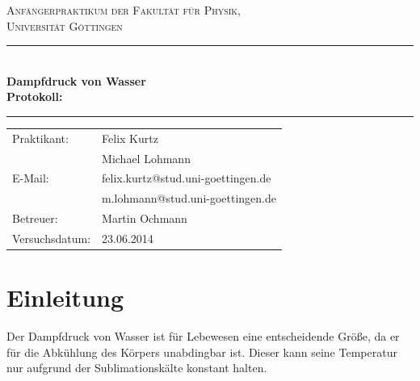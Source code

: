 \documentclass[12pt,a4paper,titlepage,headinclude,bibtotoc]{scrartcl}
\begin{document}
\begin{titlepage}
\centering
\textsc{\Large Anfängerpraktikum der Fakultät für
  Physik,\\[1.5ex] Universität Göttingen}

\vspace*{4.2cm}

\rule{\textwidth}{1pt}\\[0.5cm]
{\huge \bfseries
  Dampfdruck von Wasser\\[1.5ex]
  Protokoll:}\\[0.5cm]
\rule{\textwidth}{1pt}

\vspace*{3.0cm}

\begin{Large}
\begin{tabular}{ll}
Praktikant:
 	&  Felix Kurtz\\
 	&  Michael Lohmann\\

  E-Mail: 
	&  felix.kurtz@stud.uni-goettingen.de\\
	& m.lohmann@stud.uni-goettingen.de\\	

 Betreuer: & Martin Ochmann\\
 Versuchsdatum: & 23.06.2014\\
\end{tabular}
\end{Large}

\vspace*{0.8cm}

\begin{Large}
\end{Large}

\end{titlepage}

\tableofcontents

\newpage

\section{Einleitung}
\label{sec:einleitung}
Der Dampfdruck von Wasser ist für Lebewesen eine entscheidende Größe, da er für die Abkühlung des Körpers unabdingbar ist.
Dieser kann seine Temperatur nur aufgrund der Sublimationskälte konstant halten.
\end{document}
